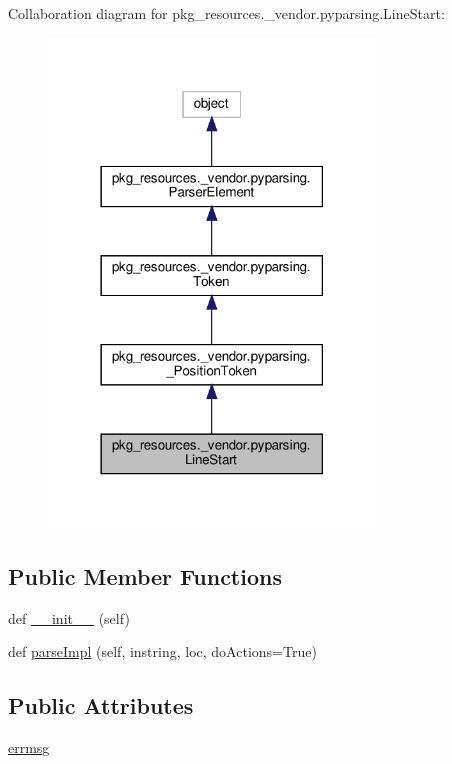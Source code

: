 Collaboration diagram for pkg\+\_\+resources.\+\_\+vendor.\+pyparsing.\+Line\+Start\+:
\nopagebreak
\begin{figure}[H]
\begin{center}
\leavevmode
\includegraphics[width=246pt]{classpkg__resources_1_1__vendor_1_1pyparsing_1_1LineStart__coll__graph}
\end{center}
\end{figure}
\subsection*{Public Member Functions}
\begin{DoxyCompactItemize}
\item 
def \hyperlink{classpkg__resources_1_1__vendor_1_1pyparsing_1_1LineStart_a0ccd31e14b4e89bc2d1ddb250c58b268}{\+\_\+\+\_\+init\+\_\+\+\_\+} (self)
\item 
def \hyperlink{classpkg__resources_1_1__vendor_1_1pyparsing_1_1LineStart_a9b6bf2a434c9abe1522dd1c6884cfff4}{parse\+Impl} (self, instring, loc, do\+Actions=True)
\end{DoxyCompactItemize}
\subsection*{Public Attributes}
\begin{DoxyCompactItemize}
\item 
\hyperlink{classpkg__resources_1_1__vendor_1_1pyparsing_1_1LineStart_acffeb01aa42138e4ddf5d24102836be5}{errmsg}
\end{DoxyCompactItemize}
